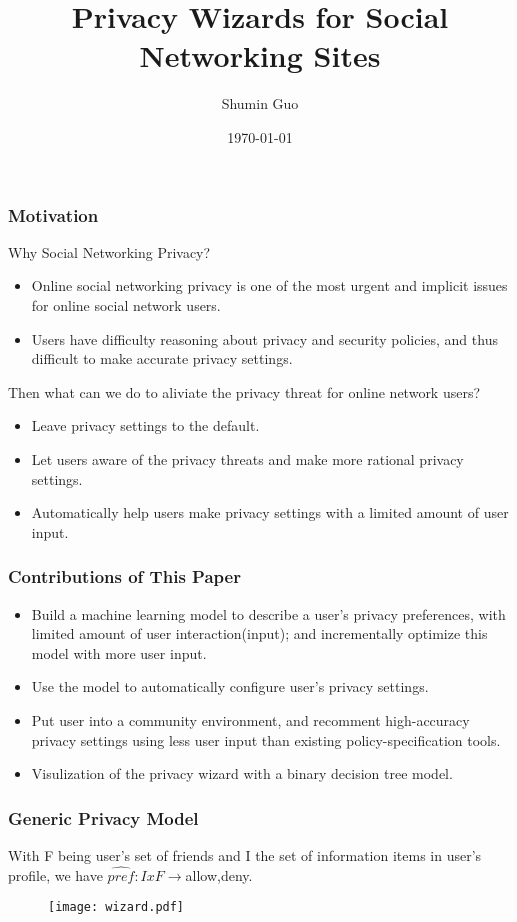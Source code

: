 \documentclass{beamer}
\title[Social Networking]{Privacy Wizards for Social Networking Sites}
\author{Shumin Guo}
\institute[Wright State University]
{
{\emph{guo.18@wright.edu}}
}
\date{\today}
\begin{document}
%
\begin{frame}
\titlepage
\end{frame}
%
\begin{frame}
\frametitle{Motivation}
\begin{block}
{Why Social Networking Privacy?}
\begin{itemize}
\item Online social networking privacy is one of the most urgent and
implicit issues for online social network users. 

\item Users have difficulty reasoning about privacy and security policies,
and thus difficult to make accurate privacy settings. 
\end{itemize}
{Then what can we do to aliviate the privacy threat for online network
users?}
\begin{itemize}
\item Leave privacy settings to the default. 
\item Let users aware of the privacy threats and make more rational
  privacy settings. 
\item Automatically help users make privacy settings with a limited
  amount of user input.
\end{itemize}
\end{block}
\end{frame}
%
\begin{frame}
\frametitle{Contributions of This Paper}
\begin{itemize} 
\item Build a machine learning model to describe a user's privacy
  preferences, with limited amount of user interaction(input); and
  incrementally optimize this model with more user input. 
\item Use the model to automatically configure user's privacy
  settings. 
\item Put user into a community environment, and recomment
  high-accuracy privacy settings using less user input than existing
  policy-specification tools. 
\item Visulization of the privacy wizard with a binary decision tree
  model. 
\end{itemize}
\end{frame}
%
\begin{frame}
\frametitle{Generic Privacy Model}
With F being user's set of friends and I the set of information items
in user's profile, we have $\widehat{pref}:IxF\rightarrow${allow,deny}.\\
\begin{figure}
\texttt{[image: wizard.pdf]}%
\end{figure}
\end{frame}
\end{document}
